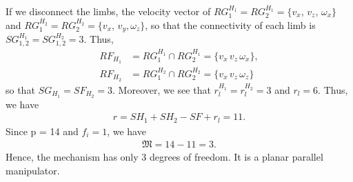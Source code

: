 If we disconnect the limbs, the velocity vector of $RG_1^{H_1} = RG_2^{H_1} = \{v_x, \, v_z, \, \omega_x\}$ and $RG_1^{H_2} = RG_2^{H_2} = \{v_x, \, v_y, \omega_z \}$, so that the connectivity of each limb is $SG_{1,2}^{H_1} = SG_{1,2}^{H_2} = 3$. Thus,
%
\begin{align}
	RF_{H_1} &= RG_1^{H_1} \cap RG_2^{H_1} = \{ v_x \, v_z \, \omega_x\}, \nonumber \\
	RF_{H_2} &= RG_1^{H_2} \cap RG_2^{H_2} = \{ v_x \, v_z \, \omega_z\}
\end{align}
%
so that $SG_{H_1} = SF_{H_2} = 3$.
%
Moreover, we see that $r_l^{H_1} = r_l^{H_2} = 3$ and $r_l = 6$. Thus, we have
%
\begin{align}
	r = SH_1 + SH_2 - SF + r_l = 11.
\end{align}
%
Since p = 14 and $f_i = 1$, we have 
%
\begin{align}
	\mathfrak{M} = 14 - 11 = 3. 
\end{align}
%
Hence, the mechanism has only 3 degrees of freedom. It is a planar parallel manipulator.
